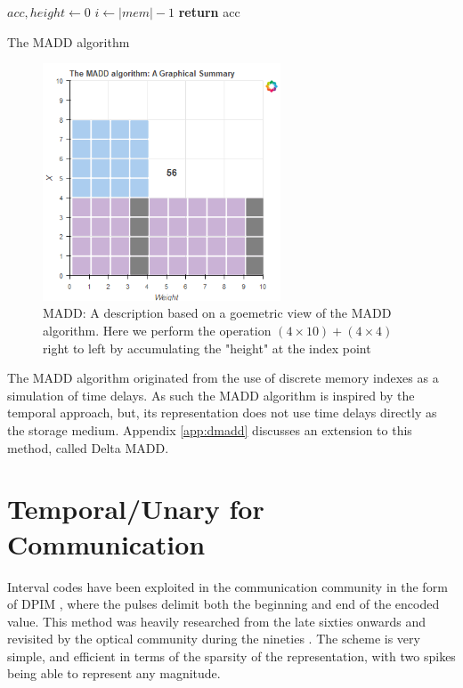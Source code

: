\documentclass{article}
\begin{document}
\begin{algorithm}
	$acc,height \gets 0$\;
	$i \gets |mem|-1$\;
	\textbf{return} acc
	\caption{The MADD algorithm} \label{madd}
\end{algorithm}

\begin{figure}[ht]
	\centerline{\includegraphics[width=200pt]{figures/rId37.png}}
	\caption{MADD: A description based on a goemetric view of the MADD algorithm. Here we perform the operation $(4 \times 10)+(4 \times 4)$ right to left by accumulating the "height" at the index point}\label{fig:madd}
\end{figure}

The MADD algorithm originated from the use of discrete memory indexes as a simulation of time delays. As such the MADD algorithm is inspired by the temporal approach, but, its representation does not use time delays directly as the storage medium. Appendix \ref{app:dmadd} discusses an extension to this method, called Delta MADD.

\section{Temporal/Unary for Communication}\label{coms}

Interval codes have been exploited in the communication community in the form of DPIM \cite{Das1967PulseintervalM}, where the pulses delimit both the beginning and end of the encoded value. This method was heavily researched from the late sixties onwards \cite{marougi1983signal} \cite{kaluarachchi1997digital} \cite{sato1978pulse} and revisited by the optical community during the nineties \cite{ghassemlooy1998digital} \cite{ghassemlooy2000digital}. The scheme is very simple, and efficient in terms of the sparsity of the representation, with two spikes being able to represent any magnitude.
\end{document}
